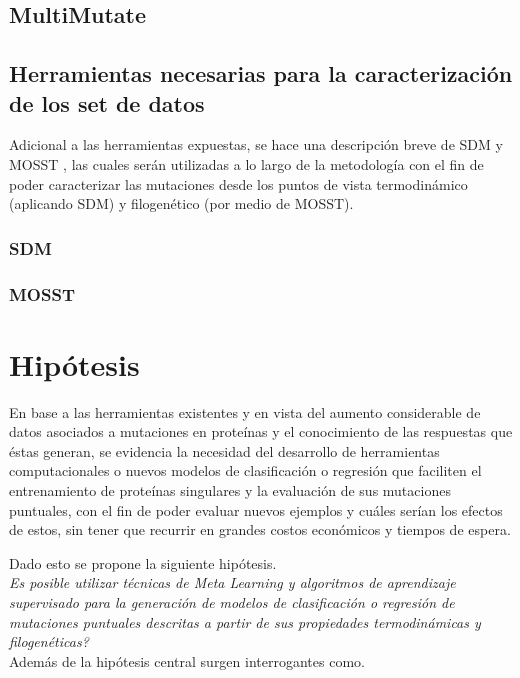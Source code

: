 \subsection{MultiMutate}


\subsection{Herramientas necesarias para la caracterización de los set de datos}

Adicional a las herramientas expuestas, se hace una descripción breve de SDM \cite{Pandurangan2017} y MOSST \cite{Olivera-Nappa2011}, las cuales serán utilizadas a lo largo de la metodología con el fin de poder caracterizar las mutaciones desde los puntos de vista termodinámico (aplicando SDM) y filogenético (por medio de MOSST).

\subsubsection{SDM}

\subsubsection{MOSST}

\section{Hipótesis}

En base a las herramientas existentes y en vista del aumento considerable de datos asociados a mutaciones en proteínas y el conocimiento de las respuestas que éstas generan, se evidencia la necesidad del desarrollo de herramientas computacionales o nuevos modelos de clasificación o regresión que faciliten el entrenamiento de proteínas singulares y la evaluación de sus mutaciones puntuales, con el fin de poder evaluar nuevos ejemplos y cuáles serían los efectos de estos, sin tener que recurrir en grandes costos económicos y tiempos de espera. 

Dado esto se propone la siguiente hipótesis.\\

\textit{Es posible utilizar técnicas de Meta Learning y algoritmos de aprendizaje supervisado para la generación de modelos de clasificación o regresión de mutaciones puntuales descritas a partir de sus propiedades termodinámicas y filogenéticas?}\\

Además de la hipótesis central surgen interrogantes como.

